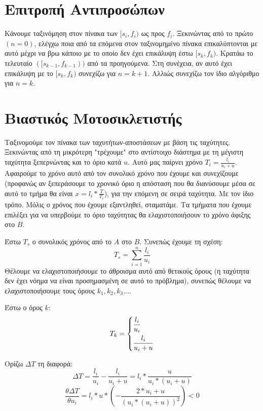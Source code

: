 \documentclass[a4paper,10pt]{article} \usepackage{anysize}
\begin{document}
\renewcommand{\labelenumi}{\roman{enumi})}
\renewcommand{\labelenumii}{(\arabic{enumii})}



\section{Επιτροπή Αντιπροσώπων} \setcounter{section}{1}
Κάνουμε ταξινόμηση στον πίνακα των $[s_i,f_i)$ ως προς $f_i$. Ξεκινώντας από
 το πρώτο $(n=0)$, ελέγχω ποια από τα επόμενα στον ταξινομημένο πίνακα επικαλύπτονται
με αυτό μέχρι να βρω κάποιο με το οποίο δεν έχει επικάλυψη έστω $[s_k,f_k)$. Κρατάω
το τελευταίο $([s_{k-1},f_{k-1}))$ από τα προηγούμενα. Στη συνέχεια, αν αυτό έχει
επικάλυψη με το $[s_k,f_k)$ συνεχίζω για $n=k+1$. Αλλιώς συνεχίζω
τον ίδιο αλγόριθμο για $n=k$.


\vspace{3cm}

\section{Βιαστικός Μοτοσικλετιστής}
Ταξινομούμε τον πίνακα των ταχυτήτων-αποστάσεων με βάση τις ταχύτητες.
Ξεκινώντας από τη μικρότερη "τρέχουμε" στο αντίστοιχο διάστημα με τη μέγιστη
ταχύτητα ξεπερνώντας και το όριο κατά $u$. Αυτό μας παίρνει χρόνο
$T_i=\frac{l_i}{u_i+u}$. Αφαιρούμε το χρόνο αυτό από τον συνολικό χρόνο που
έχουμε και συνεχίζουμε (προφανώς αν ξεπεράσουμε το χρονικό όριο η απόσταση που
θα διανύσουμε μέσα σε αυτό το τμήμα θα είναι $x=l_i*\frac{T}{T_i}$), για την
επόμενη σε σειρά ταχύτητα. Με τον ίδιο τρόπο. Μόλις ο χρόνος που έχουμε
εξαντληθεί, σταματάμε. Τα τμήματα που έχουμε επιλέξει για να υπερβούμε το όριο
ταχύτητας θα ελαχιστοποιήσουν το χρόνο άφιξης στο $B$.

Έστω $T_s$ ο συνολικός χρόνος από το $A$ στο $B$. Συνεπώς έχουμε τη σχέση:
\[
T_s=\sum_{i=1}^n{\frac{l_i}{u_i}}
\]
Θέλουμε να ελαχιστοποιήσουμε το άθροισμα αυτό από θετικούς όρους (η ταχύτητα
δεν έχει νόημα να είναι προσημασμένη σε αυτό το πρόβλημα), συνεπώς θέλουμε να
ελαχιστοποιήσουμε τους όρους $k_1, k_2, k_3 ...$.

Έστω ο όρος $k$:
\[
T_k=
	\begin{dcases}
	\frac{l_i}{u_i} \\
	\frac{l_i}{u_i+u}  
	\end{dcases}
\]

Ορίζω $\Delta{T}$ τη διαφορά:
\[
	\Delta{T}=\frac{l_i}{u_i} - \frac{l_i}{u_i+u} = l_i*\frac{u}{u_i*(u_i+u)}
\] 
\[
	\frac{\theta{\Delta{T}}}{\theta{u_i}} =
	l_i*u*(-\frac{2*u_i+u}{(u_i*(u_i+u))^2}) < 0
\]
\end{document}

